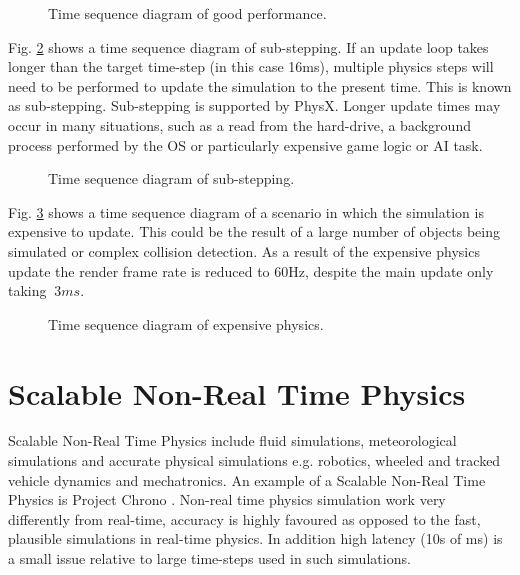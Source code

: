\begin{figure}
	\centering
	
	\caption{Time sequence diagram of good performance.}
	\label{GoodPerf}
\end{figure}

Fig. \ref{SubStep} shows a time sequence diagram of sub-stepping. If an update loop takes longer than the target time-step (in this case 16ms), multiple physics steps will need to be performed to update the simulation to the present time. This is known as sub-stepping. Sub-stepping is supported by PhysX. Longer update times may occur in many situations, such as a read from the hard-drive, a background process performed by the OS or particularly expensive game logic or AI task.

\begin{figure}
	\centering
	
	\caption{Time sequence diagram of sub-stepping.}
	\label{SubStep}
\end{figure}

Fig. \ref{ExpensivePhysics} shows a time sequence diagram of a scenario in which the simulation is expensive to update. This could be the result of a large number of objects being simulated or complex collision detection. As a result of the expensive physics update the render frame rate is reduced to 60Hz, despite the main update only taking $~3ms$.

\begin{figure}
	\centering
	
	\caption{Time sequence diagram of expensive physics.}
	\label{ExpensivePhysics}
\end{figure}

%
%	

\section{Scalable Non-Real Time Physics}
Scalable Non-Real Time Physics include fluid simulations, meteorological simulations and accurate physical simulations e.g. robotics, wheeled and tracked vehicle dynamics and mechatronics. An example of a Scalable Non-Real Time Physics is Project Chrono \cite{Chrono}. Non-real time physics simulation work very differently from real-time, accuracy is highly favoured as opposed to the fast, plausible simulations in real-time physics. In addition high latency (10s of ms) is a small issue relative to large time-steps used in such simulations.

